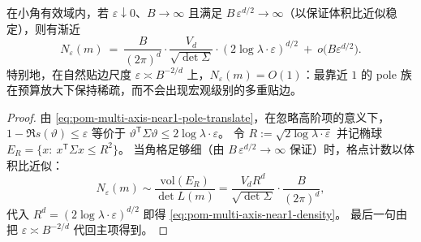 \begin{proposition}[贴边极点计数主项]\label{prop:pom-multi-axis-near1-density}
在小角有效域内，若 \(\varepsilon\downarrow 0\)、\(B\to\infty\) 且满足 \(B\,\varepsilon^{d/2}\to\infty\)（以保证体积比近似稳定），则有渐近
\begin{equation}\label{eq:pom-multi-axis-near1-density}
N_{\varepsilon}(m)
\ =\
\frac{B}{(2\pi)^{d}}\cdot\frac{V_{d}}{\sqrt{\det\Sigma}}\cdot(2\log\lambda\cdot\varepsilon)^{d/2}
\ +\ o\!\bigl(B\varepsilon^{d/2}\bigr).
\end{equation}
特别地，在自然贴边尺度 \(\varepsilon\asymp B^{-2/d}\) 上，\(N_\varepsilon(m)=O(1)\)：最靠近 \(1\) 的 pole 族在预算放大下保持稀疏，而不会出现宏观级别的多重贴边。
\end{proposition}

\begin{proof}
由 \eqref{eq:pom-multi-axis-near1-pole-translate}，在忽略高阶项的意义下，
\(
1-\Re s(\vartheta)\le \varepsilon
\)
等价于
\(
\vartheta^{\mathsf T}\Sigma\vartheta\le 2\log\lambda\cdot\varepsilon
\)。
令 \(R:=\sqrt{2\log\lambda\cdot\varepsilon}\) 并记椭球 \(E_R=\{x:\ x^{\mathsf T}\Sigma x\le R^2\}\)。
当角格足够细（由 \(B\,\varepsilon^{d/2}\to\infty\) 保证）时，格点计数以体积比近似：
\[
N_\varepsilon(m)
\sim
\frac{\mathrm{vol}(E_R)}{\det L(m)}
=\frac{V_d R^d}{\sqrt{\det\Sigma}}\cdot\frac{B}{(2\pi)^d},
\]
代入 \(R^d=(2\log\lambda\cdot\varepsilon)^{d/2}\) 即得 \eqref{eq:pom-multi-axis-near1-density}。
最后一句由把 \(\varepsilon\asymp B^{-2/d}\) 代回主项得到。
\end{proof}

